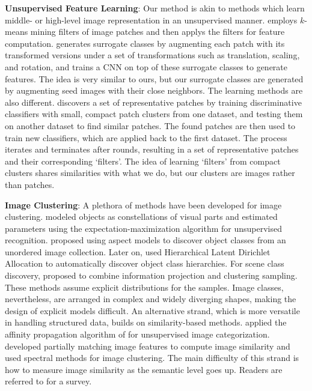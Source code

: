 \textbf{Unsupervised Feature Learning}: Our method is akin to methods which learn middle- or high-level image
representation in an unsupervised manner. \citep{stl-10} employs
$k$-means mining filters of image patches and then applys the filters
for feature computation. \citep{cnnfet14} generates surrogate classes
by augmenting each patch with its transformed versions under a set of
transformations such as translation, scaling, and rotation, and trains
a CNN on top of these surrogate classes to generate features. The idea
is very similar to ours, but our surrogate classes are generated by
augmenting seed images with their close neighbors. The learning
methods are also different. \citep{mid-level:patches} discovers a set
of representative patches by training discriminative classifiers with
small, compact patch clusters from one dataset, and testing them on
another dataset to find similar patches. The found patches are then
used to train new classifiers, which are applied back to the first
dataset. The process iterates and terminates after rounds, resulting
in a set of representative patches and their corresponding
`filters'. The idea of learning `filters' from compact clusters shares
similarities with what we do, but our clusters are images rather than
patches.
    
\textbf{Image Clustering}: A plethora of methods have been developed for image clustering.  
\citet{Fergus03} modeled
objects as constellations of visual parts and estimated parameters
using the expectation-maximization algorithm for unsupervised
recognition. \citet{Sivic05b} proposed using aspect models
to discover object classes from an unordered image
collection. Later on, \citet{Sivic08} used Hierarchical Latent
Dirichlet Allocation to automatically discover object class
hierarchies. For scene class discovery, \citet{dai}
proposed to combine information projection and clustering
sampling. These methods assume explicit distributions for the samples.
Image classes, nevertheless, are arranged in complex
and widely diverging shapes, making the design of explicit models
difficult. %
An alternative strand, which is more versatile in handling structured
data, builds on similarity-based methods. 
\citet{Frey_AffinityPropagation} applied the affinity propagation
algorithm of \citep{Frey_Dueck_2007} for unsupervised image
categorization.  \citet{Grauman06} developed
partially matching image features to compute image similarity and used
spectral methods for image clustering.
The main difficulty of this strand is how to measure image similarity
as the semantic level goes up.  
Readers are referred to \citep{Tuytelaars_UnsupervisedSurvey} for a survey.

